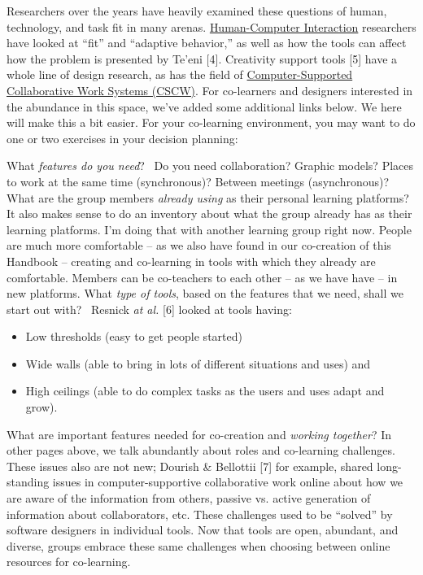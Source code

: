 Researchers over the years have heavily examined these questions of
human, technology, and task fit in many arenas.
\href{http://en.wikipedia.org/wiki/Human-Computer_Interaction}{Human-Computer
Interaction} researchers have looked at ``fit'' and ``adaptive
behavior,'' as well as how the tools can affect how the problem is
presented by Te'eni {{[}4{]}}. Creativity support tools {{[}5{]}} have a
whole line of design research, as has the field of
\href{http://en.wikipedia.org/wiki/Computer-supported_cooperative_work}{Computer-Supported
Collaborative Work Systems (CSCW)}. For co-learners and designers
interested in the abundance in this space, we've added some additional
links below. We here will make this a bit easier. For your co-learning
environment, you may want to do one or two exercises in your decision
planning:

What \emph{features do you need}?~ Do you need collaboration? Graphic
models? Places to work at the same time (synchronous)? Between meetings
(asynchronous)? What are the group members \emph{already using} as their
personal learning platforms? It also makes sense to do an inventory
about what the group already has as their learning platforms. I'm doing
that with another learning group right now. People are much more
comfortable -- as we also have found in our co-creation of this Handbook
-- creating and co-learning in tools with which they already are
comfortable. Members can be co-teachers to each other -- as we have have
-- in new platforms. What \emph{type of tools}, based on the features
that we need, shall we start out with?~ Resnick \emph{at al.} {{[}6{]}}
looked at tools having:

\begin{itemize}
\tightlist
\item
  Low thresholds (easy to get people started)
\item
  Wide walls (able to bring in lots of different situations and uses)
  and
\item
  High ceilings (able to do complex tasks as the users and uses adapt
  and grow).
\end{itemize}

What are important features needed for co-creation and \emph{working
together}? In other pages above, we talk abundantly about roles and
co-learning challenges. These issues also are not new; Dourish \&
Bellottii {{[}7{]}} for example, shared long-standing issues in
computer-supportive collaborative work online about how we are aware of
the information from others, passive vs. active generation of
information about collaborators, etc. These challenges used to be
``solved'' by software designers in individual tools. Now that tools are
open, abundant, and diverse, groups embrace these same challenges when
choosing between online resources for co-learning.

